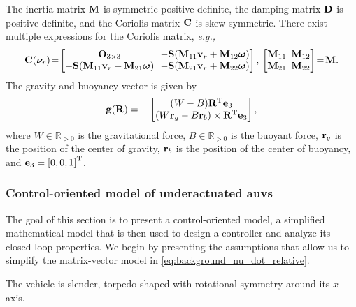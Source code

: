 The inertia matrix $\mathbf{M}$ is symmetric positive definite, the damping matrix $\mathbf{D}$ is positive definite, and the Coriolis matrix $\mathbf{C}$ is skew-symmetric.
There exist multiple expressions for the Coriolis matrix, \emph{e.g.,}
\begin{equation}
    \label{eq:background_coriolis}
    \mat{C}(\bs{\nu}_r)\! =\!
    \begin{bmatrix}
        \mat{O}_{3 \times 3} & \!\!-\mat{S}(\mat{M}_{11}\mat{v}_r + \mat{M}_{12}\bs{\omega}) \\
        -\mat{S}(\mat{M}_{11}\mat{v}_r + \mat{M}_{21}\bs{\omega}) & \!\!-\mat{S}(\mat{M}_{21}\mat{v}_r + \mat{M}_{22}\bs{\omega})
    \end{bmatrix}, \,
    \begin{bmatrix}
        \mat{M}_{11} & \!\!\!\mat{M}_{12} \\ \mat{M}_{21} & \!\!\!\mat{M}_{22}
    \end{bmatrix}\!
    = \!\mat{M}.
\end{equation}
The gravity and buoyancy vector is given by \cite{fossen_handbook_2011}
\begin{equation}
    \mathbf{g}(\mathbf{R}) = -
    \begin{bmatrix}
        (W - B) \mathbf{R}^{\mathrm{T}} \mathbf{e}_3 \\
        (W\mathbf{r}_g - B\mathbf{r}_b) \times \mathbf{R}^{\mathrm{T}} \mathbf{e}_3
    \end{bmatrix},
\end{equation}
where $W \in \mathbb{R}_{> 0}$ is the gravitational force, $B \in \mathbb{R}_{> 0}$ is the buoyant force, $\mathbf{r}_g$ is the position of the center of gravity, $\mathbf{r}_b$ is the position of the center of buoyancy, and $\mathbf{e}_3 = \left[0, 0, 1\right]^{\mathrm{T}}$.

\subsubsection*{Control-oriented model of underactuated \glspl{auv}}
The goal of this section is to present a control-oriented model, a simplified mathematical model that is then used to design a controller and analyze its closed-loop properties.
We begin by presenting the assumptions that allow us to simplify the matrix-vector model in \eqref{eq:background_nu_dot_relative}.

\begin{asm}
    \label{asm:symmetric}
    The vehicle is slender, torpedo-shaped with rotational symmetry around its $x$-axis.
\end{asm}

